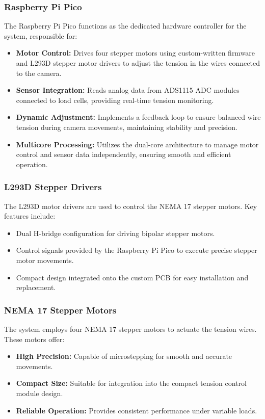 \subsubsection{Raspberry Pi Pico}
The Raspberry Pi Pico functions as the dedicated hardware controller for the system, responsible for:
\begin{itemize}
    \item \textbf{Motor Control:} Drives four stepper motors using custom-written firmware and L293D stepper motor drivers to adjust the tension in the wires connected to the camera.
    \item \textbf{Sensor Integration:} Reads analog data from ADS1115 ADC modules connected to load cells, providing real-time tension monitoring.
    \item \textbf{Dynamic Adjustment:} Implements a feedback loop to ensure balanced wire tension during camera movements, maintaining stability and precision.
    \item \textbf{Multicore Processing:} Utilizes the dual-core architecture to manage motor control and sensor data independently, ensuring smooth and efficient operation.
\end{itemize}

\subsubsection{L293D Stepper Drivers}
The L293D motor drivers are used to control the NEMA 17 stepper motors. Key features include:
\begin{itemize}
    \item Dual H-bridge configuration for driving bipolar stepper motors.
    \item Control signals provided by the Raspberry Pi Pico to execute precise stepper motor movements.
    \item Compact design integrated onto the custom PCB for easy installation and replacement.
\end{itemize}

\subsubsection{NEMA 17 Stepper Motors}
The system employs four NEMA 17 stepper motors to actuate the tension wires. These motors offer:
\begin{itemize}
    \item \textbf{High Precision:} Capable of microstepping for smooth and accurate movements.
    \item \textbf{Compact Size:} Suitable for integration into the compact tension control module design.
    \item \textbf{Reliable Operation:} Provides consistent performance under variable loads.
\end{itemize}

